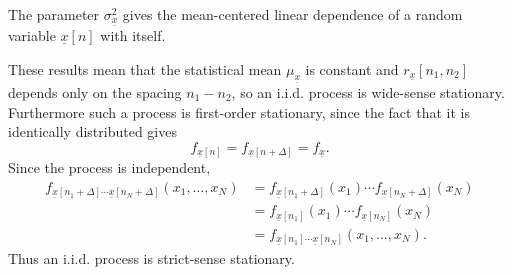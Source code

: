 \documentclass{article}
\begin{document}
The parameter $\sigma_{\underline{x}}^2$ gives the mean-centered linear dependence of a random
variable $\underline{x}[n]$ with itself.

These results mean that the statistical mean $\mu_{\underline{x}}$
is constant and $r_{\underline{x}}[n_1, n_2]$ depends only on the spacing $n_1 - n_2$, so an
i.i.d. process is wide-sense stationary. Furthermore such a process is first-order stationary,
since the fact that it is identically distributed gives
$$
f_{\underline{x}[n]} = f_{\underline{x}[n + \Delta]} = f_{\underline{x}}.
$$
Since the process is independent,
\begin{align*}
f_{\underline{x}[n_1 + \Delta] \cdots \underline{x}[n_N + \Delta]}
  (x_1, \dots, x_N) 
&= f_{\underline{x}[n_1 + \Delta]}(x_1) \cdots
   f_{\underline{x}[n_N + \Delta]}(x_N) \\
&= f_{\underline{x}[n_1]}(x_1) \cdots
   f_{\underline{x}[n_N]}(x_N) \\
&= f_{\underline{x}[n_1] \cdots \underline{x}[n_N]}
  (x_1, \dots, x_N).
\end{align*}
Thus an i.i.d. process is strict-sense stationary.
\end{document}
